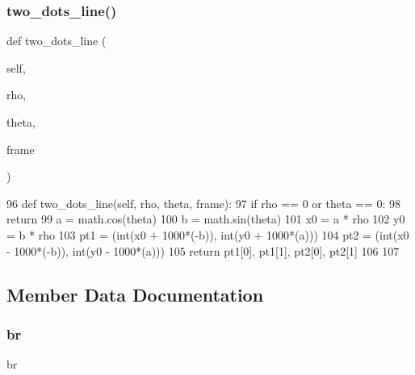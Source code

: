 \subsubsection{\texorpdfstring{two\+\_\+dots\+\_\+line()}{two\_dots\_line()}}
{\footnotesize\ttfamily def two\+\_\+dots\+\_\+line (\begin{DoxyParamCaption}\item[{}]{self,  }\item[{}]{rho,  }\item[{}]{theta,  }\item[{}]{frame }\end{DoxyParamCaption})}


\begin{DoxyCode}
96   \textcolor{keyword}{def }two\_dots\_line(self, rho, theta, frame):
97       \textcolor{keywordflow}{if} rho == 0 \textcolor{keywordflow}{or} theta == 0:
98           \textcolor{keywordflow}{return}
99       a = math.cos(theta)
100       b = math.sin(theta)
101       x0 = a * rho
102       y0 = b * rho
103       pt1 = (int(x0 + 1000*(-b)), int(y0 + 1000*(a)))
104       pt2 = (int(x0 - 1000*(-b)), int(y0 - 1000*(a)))
105       \textcolor{keywordflow}{return} pt1[0], pt1[1], pt2[0], pt2[1]
106 
107 
\end{DoxyCode}


\subsection{Member Data Documentation}
\mbox{\label{classtoxic__vision_1_1lane__detector_1_1ImageSubscriber_a88f0860257ba6bdc089557444f5cdd16}} 
\subsubsection{\texorpdfstring{br}{br}}
{\footnotesize\ttfamily br}

\mbox{\label{classtoxic__vision_1_1lane__detector_1_1ImageSubscriber_a23e707c10db59b59318fc639544333c0}} 
